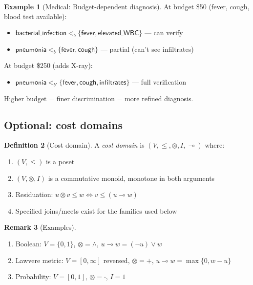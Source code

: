 \documentclass[11pt]{article}
\theoremstyle{definition}
\newtheorem{definition}{Definition}[section]
\newtheorem{remark}[definition]{Remark}
\newtheorem{example}[definition]{Example}
\theoremstyle{plain}
\newcommand{\covers}{\triangleleft}
\begin{document}
\begin{example}[Medical: Budget-dependent diagnosis]
At budget \$50 (fever, cough, blood test available):
\begin{itemize}
  \item $\mathsf{bacterial\_infection} \covers_b \{\mathsf{fever}, \mathsf{elevated\_WBC}\}$ --- can verify
  \item $\mathsf{pneumonia} \covers_b \{\mathsf{fever}, \mathsf{cough}\}$ --- partial (can't see infiltrates)
\end{itemize}

At budget \$250 (adds X-ray):
\begin{itemize}
  \item $\mathsf{pneumonia} \covers_{b'} \{\mathsf{fever}, \mathsf{cough}, \mathsf{infiltrates}\}$ --- full verification
\end{itemize}

Higher budget = finer discrimination = more refined diagnosis.
\end{example}

\subsection{Optional: cost domains}

\begin{definition}[Cost domain]\label{def:cost-domain}
A \emph{cost domain} is $(V,\le,\otimes,I,\multimap)$ where:
\begin{enumerate}[label=(\alph*)]
\item $(V,\le)$ is a poset
\item $(V,\otimes,I)$ is a commutative monoid, monotone in both arguments
\item Residuation: $u\otimes v \le w \Longleftrightarrow v \le (u\multimap w)$
\item Specified joins/meets exist for the families used below
\end{enumerate}
\end{definition}

\begin{remark}[Examples]
\begin{enumerate}[label=(\roman*)]
\item Boolean: $V=\{0,1\}$, $\otimes=\wedge$, $u\multimap w=(\neg u)\vee w$
\item Lawvere metric: $V=[0,\infty]$ reversed, $\otimes=+$, $u\multimap w=\max\{0,w-u\}$
\item Probability: $V = [0,1]$, $\otimes = \cdot$, $I = 1$
\end{enumerate}
\end{remark}
\end{document}
